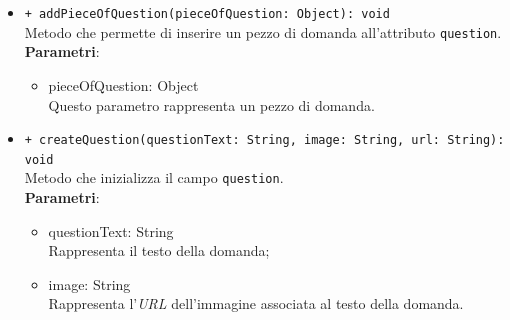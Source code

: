 \begin{itemize}
\begin{itemize}
				\item \texttt{+ addPieceOfQuestion(pieceOfQuestion: Object): void} \\
				Metodo che permette di inserire un pezzo di domanda all'attributo \texttt{question}.\\
				\textbf{Parametri}:
				\begin{itemize}
					\item {pieceOfQuestion: Object}\\
					Questo parametro rappresenta un pezzo di domanda.
				\end{itemize}
				
				\item \texttt{+ createQuestion(questionText: String, image: String, url: String):\\ void} \\
				Metodo che inizializza il campo \texttt{question}.\\
				\textbf{Parametri}:
				\begin{itemize}
					\item {questionText: String}\\
					Rappresenta il testo della domanda;
					\item {image: String}\\
					Rappresenta l'\textit{URL} dell'immagine associata al testo della domanda. 
				\end{itemize}	
			\end{itemize}
		\end{itemize}
		
		